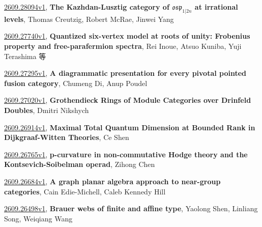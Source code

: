 \documentclass[9pt, a4paper]{article}
\theoremstyle{plain}
\theoremstyle{definition}
\theoremstyle{remark}
\newcommand{\arxiv}[3]{\href{https://arxiv.org/abs/#1}{#1}, \textbf{\textcolor{arxivblue}{#2}}, #3}
\begin{document}
\arxiv{2609.28094v1}{The Kazhdan-Lusztig category of $\mathfrak{osp}_{1|2n}$ at irrational levels}{Thomas Creutzig, Robert McRae, Jinwei Yang}

\arxiv{2609.27740v1}{Quantized six-vertex model at roots of unity: Frobenius property and free-parafermion spectra}{Rei Inoue, Atsuo Kuniba, Yuji Terashima 等}

\arxiv{2609.27295v1}{A diagrammatic presentation for every pivotal pointed fusion category}{Chumeng Di, Anup Poudel}

\arxiv{2609.27020v1}{Grothendieck Rings of Module Categories over Drinfeld Doubles}{Dmitri Nikshych}

\arxiv{2609.26914v1}{Maximal Total Quantum Dimension at Bounded Rank in Dijkgraaf-Witten Theories}{Ce Shen}

\arxiv{2609.26765v1}{p-curvature in non-commutative Hodge theory and the Kontsevich-Soibelman operad}{Zihong Chen}

\arxiv{2609.26684v1}{A graph planar algebra approach to near-group categories}{Cain Edie-Michell, Caleb Kennedy Hill}

\arxiv{2609.26498v1}{Brauer webs of finite and affine type}{Yaolong Shen, Linliang Song, Weiqiang Wang}

\end{document}
